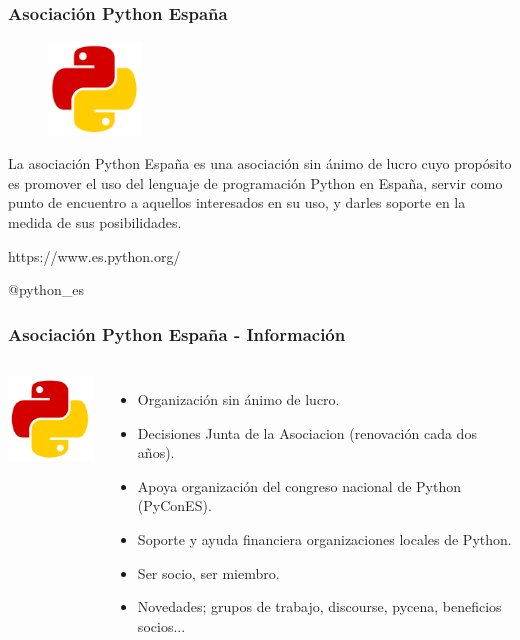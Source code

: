 \documentclass[18pt]{beamer}
\begin{document}
\begin{frame}

	\frametitle{Asociación Python España}
	
	\begin{figure}
		\includegraphics[width=2.5cm]{images/python_spain.png}
	\end{figure}
	
	La asociación Python España es una asociación sin ánimo de lucro cuyo propósito 
	es promover el uso del lenguaje de programación Python en España, servir como 
	punto de encuentro a aquellos interesados en su uso, y darles soporte en la medida 
	de sus posibilidades.

	\vspace{0.3cm}
	\centerline{https://www.es.python.org/}
	
	\vspace{0.4cm}
	\centerline{@python\_es}	
	
\end{frame}


\begin{frame}

	\frametitle{Asociación Python España - Información}
		
	\begin{columns}
		\centering
			\includegraphics[width=2.5cm]{images/python_spain.png}
			
		\begin{itemize}
			\setlength\itemsep{0.6em}		
			\item Organización sin ánimo de lucro.
			\item Decisiones Junta de la Asociacion (renovación cada dos años).
			\item Apoya organización del congreso nacional de Python (PyConES).
			\item Soporte y ayuda financiera organizaciones locales de Python.
			\item Ser socio, ser miembro.
			\item Novedades; grupos de trabajo, discourse, pycena, 
			beneficios socios...  
		\end{itemize}
	\end{columns}
	
\end{frame}
\end{document}
